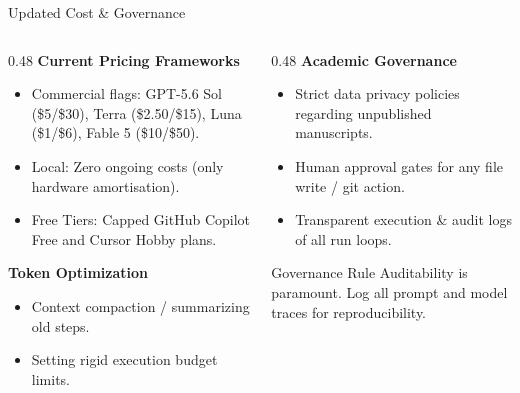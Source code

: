 \begin{frame}{Updated Cost \& Governance}
  \begin{columns}[T, onlytextwidth]
    \begin{column}{0.48\textwidth}
      \textbf{Current Pricing Frameworks}
      \begin{itemize}
        \item Commercial flags: GPT-5.6 Sol (\$5/\$30), Terra (\$2.50/\$15), Luna (\$1/\$6), Fable 5 (\$10/\$50).
        \item Local: Zero ongoing costs (only hardware amortisation).
        \item Free Tiers: Capped GitHub Copilot Free and Cursor Hobby plans.
      \end{itemize}
      \vspace{0.4em}
      \textbf{Token Optimization}
      \begin{itemize}
        \item Context compaction / summarizing old steps.
        \item Setting rigid execution budget limits.
      \end{itemize}
    \end{column}
    \hfill
    \begin{column}{0.48\textwidth}
      \textbf{Academic Governance}
      \begin{itemize}
        \item Strict data privacy policies regarding unpublished manuscripts.
        \item Human approval gates for any file write / git action.
        \item Transparent execution \& audit logs of all run loops.
      \end{itemize}
      \vspace{0.4em}
      \begin{block}{Governance Rule}
        Auditability is paramount. Log all prompt and model traces for reproducibility.
      \end{block}
    \end{column}
  \end{columns}
\end{frame}
